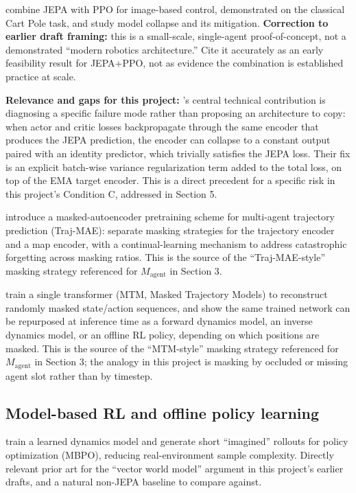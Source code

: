 \documentclass[11pt]{article}
\begin{document}
\citet{kenneweg2025jeparl} combine JEPA with PPO for image-based control, demonstrated on the classical Cart Pole task, and study model collapse and its mitigation. \textbf{Correction to earlier draft framing:} this is a small-scale, single-agent proof-of-concept, not a demonstrated ``modern robotics architecture.'' Cite it accurately as an early feasibility result for JEPA+PPO, not as evidence the combination is established practice at scale.

\textbf{Relevance and gaps for this project:} \citeauthor{kenneweg2025jeparl}'s central technical contribution is diagnosing a specific failure mode rather than proposing an architecture to copy: when actor and critic losses backpropagate through the same encoder that produces the JEPA prediction, the encoder can collapse to a constant output paired with an identity predictor, which trivially satisfies the JEPA loss. Their fix is an explicit batch-wise variance regularization term added to the total loss, on top of the EMA target encoder. This is a direct precedent for a specific risk in this project's Condition C, addressed in Section 5.

\citet{chen2023trajmae} introduce a masked-autoencoder pretraining scheme for multi-agent trajectory prediction (Traj-MAE): separate masking strategies for the trajectory encoder and a map encoder, with a continual-learning mechanism to address catastrophic forgetting across masking ratios. This is the source of the ``Traj-MAE-style'' masking strategy referenced for \(M_{\text{agent}}\) in Section 3.

\citet{wu2023mtm} train a single transformer (MTM, Masked Trajectory Models) to reconstruct randomly masked state/action sequences, and show the same trained network can be repurposed at inference time as a forward dynamics model, an inverse dynamics model, or an offline RL policy, depending on which positions are masked. This is the source of the ``MTM-style'' masking strategy referenced for \(M_{\text{agent}}\) in Section 3; the analogy in this project is masking by occluded or missing agent slot rather than by timestep.

\hypertarget{model-based-rl-and-offline-policy-learning}{%
\subsection{Model-based RL and offline policy learning}\label{model-based-rl-and-offline-policy-learning}}

\citet{janner2019mbpo} train a learned dynamics model and generate short ``imagined'' rollouts for policy optimization (MBPO), reducing real-environment sample complexity. Directly relevant prior art for the ``vector world model'' argument in this project's earlier drafts, and a natural non-JEPA baseline to compare against.
\end{document}

